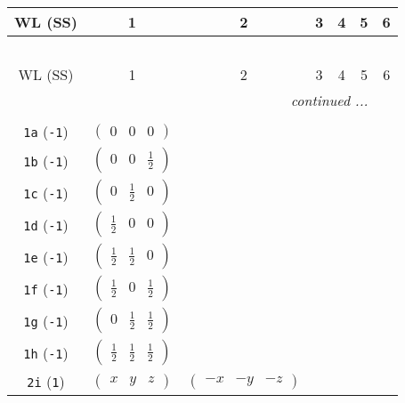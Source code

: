 \documentclass[fleqn,9pt,landscape]{jsarticle}
\begin{document}
\begin{center}
\renewcommand{\arraystretch}{1.2}
\begin{longtable}{ccccccc}
 \hline \hline
WL (SS) & 1 & 2 & 3 & 4 & 5 & 6 \\ \hline \endfirsthead

\multicolumn{6}{l}{\tablename\ \thetable{}} \\
 \hline \hline
WL (SS) & 1 & 2 & 3 & 4 & 5 & 6 \\ \hline \endhead

 \hline \hline
\multicolumn{6}{r}{\footnotesize\it continued ...} \\ \endfoot

 \hline \hline
\multicolumn{6}{r}{} \\ \endlastfoot

{\tt 1a} ({\tt -1}) & $ \begin{pmatrix} 0 & 0 & 0 \end{pmatrix} $ & $  $ \\ \hline
{\tt 1b} ({\tt -1}) & $ \begin{pmatrix} 0 & 0 & \frac{1}{2} \end{pmatrix} $ & $  $ \\ \hline
{\tt 1c} ({\tt -1}) & $ \begin{pmatrix} 0 & \frac{1}{2} & 0 \end{pmatrix} $ & $  $ \\ \hline
{\tt 1d} ({\tt -1}) & $ \begin{pmatrix} \frac{1}{2} & 0 & 0 \end{pmatrix} $ & $  $ \\ \hline
{\tt 1e} ({\tt -1}) & $ \begin{pmatrix} \frac{1}{2} & \frac{1}{2} & 0 \end{pmatrix} $ & $  $ \\ \hline
{\tt 1f} ({\tt -1}) & $ \begin{pmatrix} \frac{1}{2} & 0 & \frac{1}{2} \end{pmatrix} $ & $  $ \\ \hline
{\tt 1g} ({\tt -1}) & $ \begin{pmatrix} 0 & \frac{1}{2} & \frac{1}{2} \end{pmatrix} $ & $  $ \\ \hline
{\tt 1h} ({\tt -1}) & $ \begin{pmatrix} \frac{1}{2} & \frac{1}{2} & \frac{1}{2} \end{pmatrix} $ & $  $ \\ \hline
{\tt 2i} ({\tt 1}) & $ \begin{pmatrix} x & y & z \end{pmatrix} $ & $ \begin{pmatrix} - x & - y & - z \end{pmatrix} $ \\
\end{longtable}
\end{center}
\end{document}

